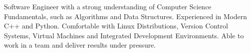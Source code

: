
\begin{cventries}
    \cventryi
        {Software Engineer with a strong understanding of Computer Science Fundamentals, such as  Algorithms and Data Structures. Experienced in Modern C++ and Python. Comfortable with Linux Distributions, Version Control Systems, Virtual Machines and Integrated Development Environments. Able to work in a team and deliver results under pressure.}
\end{cventries}
